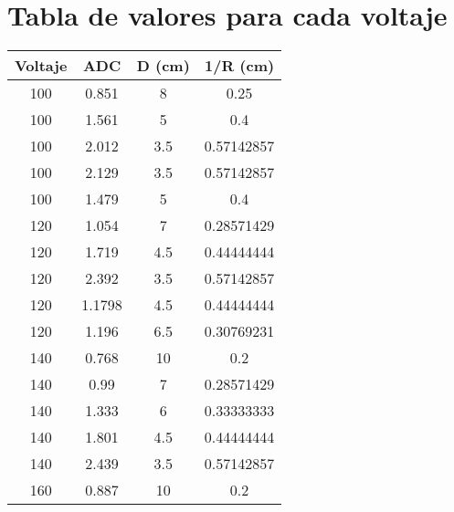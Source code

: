 




\section{Tabla de valores para cada voltaje}

\begin{table}[H]
    \centering
    \begin{tabular}{@{}cccc@{}}
    \toprule
    \textbf{Voltaje} &  \textbf{ADC} &  \textbf{D (cm)} & \textbf{1/R (cm)} \\ \midrule
    100           & 0.851     & 8                     & 0.25                    \\
    100           & 1.561     & 5                     & 0.4                     \\
    100           & 2.012     & 3.5                   & 0.57142857              \\
    100           & 2.129     & 3.5                   & 0.57142857              \\
    100           & 1.479     & 5                     & 0.4                     \\
    120           & 1.054     & 7                     & 0.28571429              \\
    120           & 1.719     & 4.5                   & 0.44444444              \\
    120           & 2.392     & 3.5                   & 0.57142857              \\
    120           & 1.1798    & 4.5                   & 0.44444444              \\
    120           & 1.196     & 6.5                   & 0.30769231              \\
    140           & 0.768     & 10                    & 0.2                     \\
    140           & 0.99      & 7                     & 0.28571429              \\
    140           & 1.333     & 6                     & 0.33333333              \\
    140           & 1.801     & 4.5                   & 0.44444444              \\
    140           & 2.439     & 3.5                   & 0.57142857              \\
    160           & 0.887     & 10                    & 0.2                     \\

\end{tabular}
\end{table}
